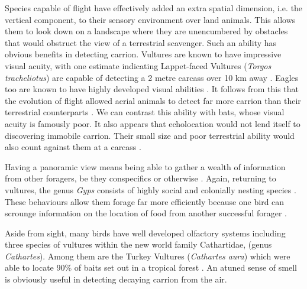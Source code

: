 \documentclass[a4paper,12pt]{article}
\begin{document}
Species capable of flight have effectively added an extra spatial dimension, i.e. the vertical component, to their sensory environment over land animals.
This allows them to look down on a landscape where they are unencumbered by obstacles that would obstruct the view of a terrestrial scavenger.
Such an ability has obvious benefits in detecting carrion.
Vultures are known to have impressive visual acuity, with one estimate indicating Lappet-faced Vultures (\textit{Torgos tracheliotus}) are capable of detecting a 2 metre carcass over 10 km away \citep{spiegel2013factors}.
Eagles too are known to have highly developed visual abilities \citep{reymond1985spatial}.
It follows from this that the evolution of flight allowed aerial animals to detect far more carrion than their terrestrial counterparts \citep{AR:AR22815}.
We can contrast this ability with bats, whose visual acuity is famously poor. 
It also appears that echolocation would not lend itself to discovering immobile carrion.
Their small size and poor terrestrial ability would also count against them at a carcass \citep{riskin2006terrestrial}.

Having a panoramic view means being able to gather a wealth of information from other foragers, be they conspecifics or otherwise \citep{jackson2008effect}.
Again, returning to vultures, the genus \textit{Gyps} consists of highly social and colonially nesting species \citep{fernandez2015density}.
These behaviours allow them forage far more efficiently because one bird can scrounge information on the location of food from another successful forager \citep{KaneVul}.



Aside from sight, many birds have well developed olfactory systems \citep{AR:AR22815} including three species of vultures within the new world family Cathartidae, (genus \textit{Cathartes}).
Among them are the Turkey Vultures (\textit{Cathartes aura}) which were able to locate 90\% of baits set out in a tropical forest \citep{houston1986olfaction}. An atuned sense of smell is obviously useful in detecting decaying carrion from the air.

\end{document}
